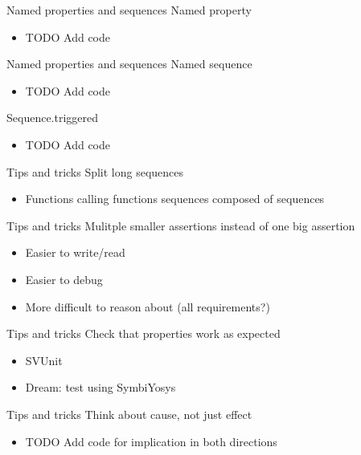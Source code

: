 \documentclass{beamer}
\begin{document}
\begin{frame}{Named properties and sequences}
Named property
\begin{itemize}
 \item TODO Add code
\end{itemize}
\end{frame}


\begin{frame}{Named properties and sequences}
Named sequence
\begin{itemize}
 \item TODO Add code
\end{itemize}
\end{frame}


\begin{frame}{Sequence.triggered}
\begin{itemize}
 \item TODO Add code
\end{itemize}
\end{frame}


\begin{frame}{Tips and tricks}
Split long sequences

\begin{itemize}
 \item Functions calling functions \textrightarrow{} sequences composed of sequences
\end{itemize}
\end{frame}


\begin{frame}{Tips and tricks}
Mulitple smaller assertions instead of one big assertion

\begin{itemize}
 \item Easier to write/read
 \item Easier to debug
 \item More difficult to reason about (all requirements?)
\end{itemize}
\end{frame}


\begin{frame}{Tips and tricks}
Check that properties work as expected

\begin{itemize}
 \item SVUnit
 \item Dream: test using SymbiYosys
\end{itemize}
\end{frame}


\begin{frame}{Tips and tricks}
Think about cause, not just effect

\begin{itemize}
 \item TODO Add code for implication in both directions
\end{itemize}
\end{frame}
\end{document}
